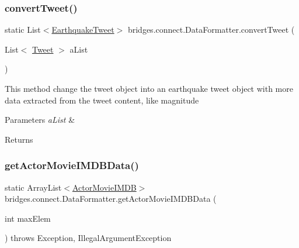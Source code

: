 \subsubsection{\texorpdfstring{convert\+Tweet()}{convertTweet()}}
{\footnotesize\ttfamily static List$<$\mbox{\hyperlink{classbridges_1_1data__src__dependent_1_1_earthquake_tweet}{Earthquake\+Tweet}}$>$ bridges.\+connect.\+Data\+Formatter.\+convert\+Tweet (\begin{DoxyParamCaption}\item[{List$<$ \mbox{\hyperlink{classbridges_1_1data__src__dependent_1_1_tweet}{Tweet}} $>$}]{a\+List }\end{DoxyParamCaption})\hspace{0.3cm}{\ttfamily [static]}}

This method change the tweet object into an earthquake tweet object with more data extracted from the tweet content, like magnitude 
\begin{DoxyParams}{Parameters}
{\em a\+List} & \\
\hline
\end{DoxyParams}
\begin{DoxyReturn}{Returns}

\end{DoxyReturn}
\mbox{\label{classbridges_1_1connect_1_1_data_formatter_aa2a84fe044615b2e1b166d412babac0f}} 
\subsubsection{\texorpdfstring{get\+Actor\+Movie\+I\+M\+D\+B\+Data()}{getActorMovieIMDBData()}}
{\footnotesize\ttfamily static Array\+List$<$\mbox{\hyperlink{classbridges_1_1data__src__dependent_1_1_actor_movie_i_m_d_b}{Actor\+Movie\+I\+M\+DB}}$>$ bridges.\+connect.\+Data\+Formatter.\+get\+Actor\+Movie\+I\+M\+D\+B\+Data (\begin{DoxyParamCaption}\item[{int}]{max\+Elem }\end{DoxyParamCaption}) throws Exception, Illegal\+Argument\+Exception\hspace{0.3cm}{\ttfamily [static]}}

